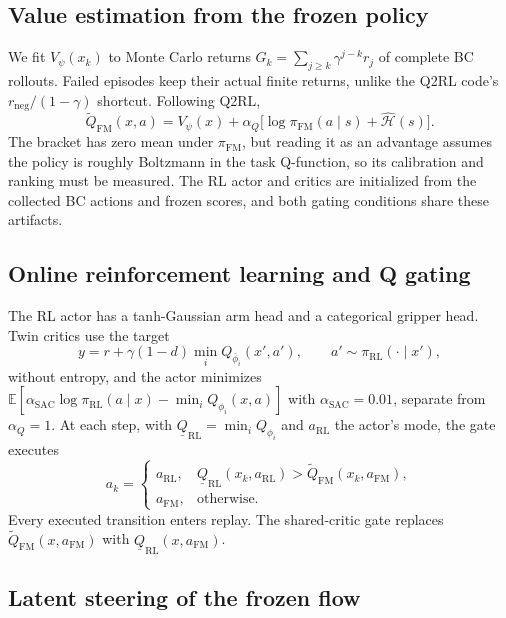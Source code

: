 \documentclass[10pt]{article}
\newcommand{\QRLlow}{\underline{Q}_{\mathrm{RL}}}
\newcommand{\QFM}{\tilde{Q}_{\mathrm{FM}}}
\newcommand{\piFM}{\pi_{\mathrm{FM}}}
\newcommand{\piRL}{\pi_{\mathrm{RL}}}
\begin{document}
\subsection{Value estimation from the frozen policy}

We fit $V_\psi(x_k)$ to Monte Carlo returns $G_k=\sum_{j\ge k}\gamma^{j-k}r_j$ of
complete BC rollouts. Failed episodes keep their actual finite returns, unlike
the Q2RL code's $r_{\mathrm{neg}}/(1-\gamma)$ shortcut. Following Q2RL,
\begin{equation}
  \QFM(x,a) = V_\psi(x) + \alpha_Q\big[\log\piFM(a\mid s) + \hat{\mathcal{H}}(s)\big].
  \label{eq:qfm}
\end{equation}
The bracket has zero mean under $\piFM$, but reading it as an advantage assumes
the policy is roughly Boltzmann in the task Q-function, so its calibration and
ranking must be measured. The RL actor and critics are initialized from the
collected BC actions and frozen scores, and both gating conditions share these
artifacts.

\subsection{Online reinforcement learning and Q gating}

The RL actor has a tanh-Gaussian arm head and a categorical gripper head. Twin
critics use the target
\begin{equation}
  y = r + \gamma(1-d)\min_i Q_{\bar\phi_i}(x',a'), \qquad a'\sim\piRL(\cdot\mid x'),
\end{equation}
without entropy, and the actor minimizes
$\mathbb{E}[\alpha_{\mathrm{SAC}}\log\piRL(a\mid x)-\min_iQ_{\phi_i}(x,a)]$ with
$\alpha_{\mathrm{SAC}}=0.01$, separate from $\alpha_Q=1$. At each step, with
$\QRLlow=\min_iQ_{\phi_i}$ and $a_{\mathrm{RL}}$ the actor's mode, the gate
executes
\begin{equation}
  a_k = \begin{cases}
    a_{\mathrm{RL}}, & \QRLlow(x_k,a_{\mathrm{RL}}) > \QFM(x_k,a_{\mathrm{FM}}),\\
    a_{\mathrm{FM}}, & \text{otherwise.}
  \end{cases}
\end{equation}
Every executed transition enters replay. The shared-critic gate replaces
$\QFM(x,a_{\mathrm{FM}})$ with $\QRLlow(x,a_{\mathrm{FM}})$.

\subsection{Latent steering of the frozen flow}
\label{sec:latent}
\end{document}
